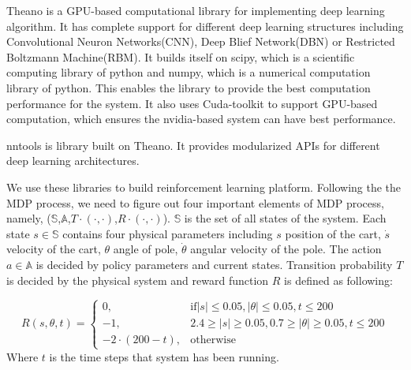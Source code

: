 \documentclass[officiallayout]{tktla}
\begin{document}
Theano is a GPU-based computational library for implementing deep learning algorithm. It has complete support for different deep learning structures including Convolutional Neuron Networks(CNN), Deep Blief Network(DBN) or Restricted Boltzmann Machine(RBM). It builds itself on scipy, which is a scientific computing library of python and numpy, which is a numerical computation library of python. This enables the library to provide the best computation performance for the system. It also uses Cuda-toolkit to support GPU-based computation, which ensures the nvidia-based system can have best performance.

nntools is library built on Theano. It provides modularized APIs for different deep learning architectures.

We use these libraries to build reinforcement learning platform. Following the the MDP process, we need to figure out four important elements of MDP process, namely, ($\mathbb{S}$,$\mathbb{A}$,$T\cdot(\cdot,\cdot)$,$R\cdot(\cdot,\cdot)$). $\mathbb{S}$ is the set of all states of the system. Each state $s \in \mathbb{S}$ contains four physical parameters including $s$ position of the cart, $\dot{s}$ velocity of the cart, $\theta$ angle of pole, $\dot{\theta}$ angular velocity of the pole. The action $a \in \mathbb{A}$ is decided by policy parameters and current states. Transition probability $T$ is decided by the physical system and reward function $R$ is defined as following:

\begin{equation}
    R(s,\theta, t)= 
\begin{cases}
    0,				& \text{if} |s|\leq 0.05, |\theta| \leq 0.05, t \leq 200\\
    -1,              & 2.4 \geq |s|\geq 0.05, 0.7 \geq |\theta| \geq 0.05, t \leq 200\\
    -2 \cdot (200 - t), 		& \text{otherwise}
\end{cases}
\end{equation}
Where $t$ is the time steps that system has been running.
\end{document}
